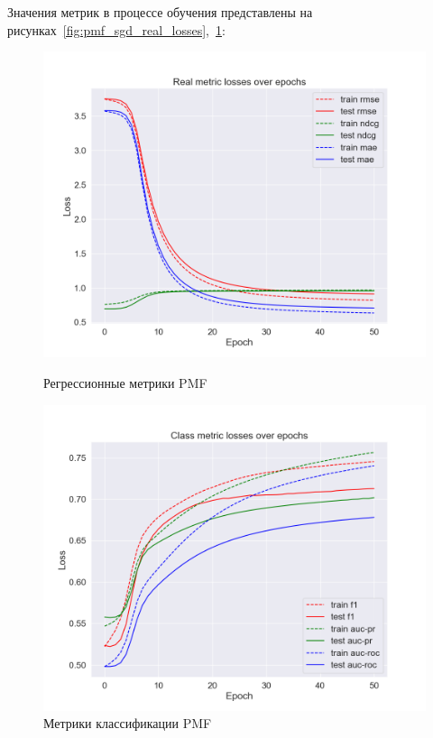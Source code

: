 Значения метрик в процессе обучения представлены на рисунках~\ref{fig:pmf_sgd_real_losses},~\ref{fig:pmf_sgd_class_losses}:

\begin{figure}[h!]
\centering
\begin{minipage}{.5\textwidth}
\centering
\includegraphics[width=1.0\linewidth]{images/pmf_sgd/real_losses}
\caption{Регрессионные метрики PMF}
\label{fig:pmf_sgd_real_losses}
\end{minipage}%
\begin{minipage}{.5\textwidth}
\centering
\includegraphics[width=1.0\linewidth]{images/pmf_sgd/class_losses}
\caption{Метрики классификации PMF}
\label{fig:pmf_sgd_class_losses}
\end{minipage}
\end{figure}


